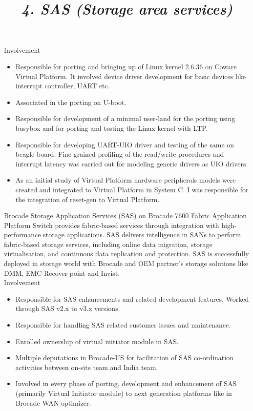 \begin{resume}
\begin {position}
Involvement
\begin{itemize} 
\item Responsible for porting and bringing up of Linux kernel 2.6.36 on Coware Virtual Platform. It involved device driver development for basic devices like interrupt controller, UART etc. 
\item Associated in the porting on U-boot.
\item Responsible for development of a minimal user-land for the porting using busybox and for porting and testing the Linux kernel with LTP. 
\item Responsible for developing UART-UIO driver and testing of the same on beagle board. Fine grained profiling of the read/write procedures and interrupt latency was carried out for modeling generic drivers as UIO drivers. 
\item As an initial study of Virtual Platform hardware peripherals models were created and integrated to Virtual Platform in System C. I was responsible for the integration of reset-gen to Virtual Platform. 
\end{itemize}
\end{position}
\hrulefill

\title{\em 4. SAS (Storage area services)}
\employer {}
\begin {position} 
Brocade Storage Application Services (SAS) on Brocade 7600 Fabric Application Platform Switch provides fabric-based services through integration with high-performance storage applications. SAS delivers intelligence in SANs to perform fabric-based storage services, including online data migration, storage virtualisation, and continuous data replication and protection. SAS is successfully deployed in storage world with Brocade and OEM partner’s storage solutions like DMM, EMC Recover-point and Invist. \\

Involvement
\begin{itemize}
\item Responsible for SAS enhancements and related development features. Worked through SAS v2.x to v3.x versions. 
\item Responsible for handling SAS related customer issues and maintenance. 
\item Enrolled ownership of virtual initiator module in SAS. 
\item Multiple deputations in Brocade-US for facilitation of SAS co-ordination activities between on-site team and India team.
\item Involved in every phase of porting, development and enhancement of SAS (primarily Virtual Initiator module) to next generation platforms like in Brocade WAN optimizer.  
\end{itemize}
\end{position}
\hrulefill


\end{resume}
